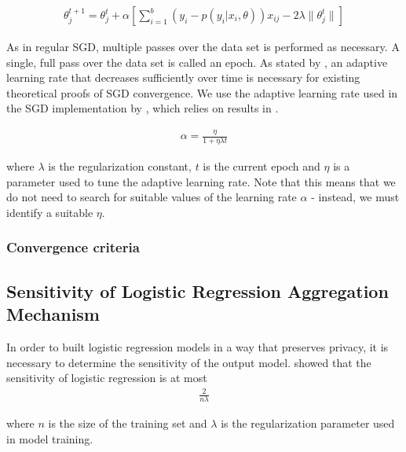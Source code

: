 \begin{eqnarray}
\theta^{t+1}_j = \theta^{t}_j + \alpha[\sum_{i=1}^{b}(y_i - p(y_i | x_i,\theta))x_{ij} - 2\lambda \|\theta^{t}_j\|]
\end{eqnarray}

As in regular SGD, multiple passes over the data set is performed as necessary. A single, full pass over the data set is called an epoch. As stated by \cite{cotter2011batchsgd}, an adaptive learning rate that decreases sufficiently over time is necessary for existing theoretical proofs of SGD convergence. We use the adaptive learning rate used in the SGD implementation by \cite{bottou2011sgd}, which relies on results in \citep{xu2010learningrate}.

\begin{eqnarray}
\label{eq:learning_rate}
\alpha = \frac{\eta}{1 + \eta\lambda t}
\end{eqnarray}

where $\lambda$ is the regularization constant, $t$ is the current epoch and $\eta$  is a parameter used to tune the adaptive learning rate. Note that this means that we do not need to search for suitable values of the learning rate $\alpha$ - instead, we must identify a suitable $\eta$.

\subsubsection{Convergence criteria}


\subsection{Sensitivity of Logistic Regression Aggregation Mechanism} \label{sec:Sensitivity_of_LogReg}

In order to built logistic regression models in a way that preserves privacy, it is necessary to determine the sensitivity of the output model. \cite{chaudhuri2009logistic} showed that the sensitivity of logistic regression is at most 
\begin{eqnarray}\label{eq:logres_sensitivity}
\frac{2}{n\lambda}
\end{eqnarray}

where $n$ is the size of the training set and $\lambda$ is the regularization parameter used in model training.

